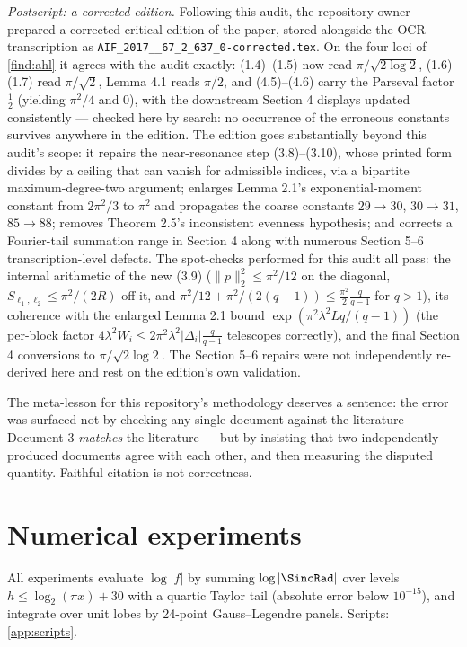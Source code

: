 \documentclass[11pt,oneside]{article}
\theoremstyle{definition}
\theoremstyle{remark}
\begin{document}
\emph{Postscript: a corrected edition.}  Following this audit, the
repository owner prepared a corrected critical edition of the paper,
stored alongside the OCR transcription as
\nolinkurl{AIF_2017__67_2_637_0-corrected.tex}.  On the four loci of
\cref{find:ahl} it agrees with the audit exactly: (1.4)--(1.5) now read
$\pi/\sqrt{2\log2}$, (1.6)--(1.7) read $\pi/\sqrt2$, Lemma 4.1 reads
$\pi/2$, and (4.5)--(4.6) carry the Parseval factor $\tfrac12$
(yielding $\pi^2/4$ and $0$), with the downstream Section 4 displays
updated consistently --- checked here by search: no occurrence of the
erroneous constants survives anywhere in the edition.  The edition goes
substantially beyond this audit's scope: it repairs the near-resonance
step (3.8)--(3.10), whose printed form divides by a ceiling that can
vanish for admissible indices, via a bipartite maximum-degree-two
argument; enlarges Lemma 2.1's exponential-moment constant from
$2\pi^2/3$ to $\pi^2$ and propagates the coarse constants
$29\to30$, $30\to31$, $85\to88$; removes Theorem 2.5's inconsistent
evenness hypothesis; and corrects a Fourier-tail summation range in
Section 4 along with numerous Section 5--6 transcription-level defects.
The spot-checks performed for this audit all pass: the internal
arithmetic of the new (3.9)
($\|p\|_2^2\le\pi^2/12$ on the diagonal, $S_{\ell_1,\ell_2}\le
\pi^2/(2R)$ off it, and
$\pi^2/12+\pi^2/(2(q-1))\le\tfrac{\pi^2}{2}\tfrac{q}{q-1}$ for
$q>1$), its coherence with the enlarged Lemma 2.1 bound
$\exp(\pi^2\lambda^2Lq/(q-1))$ (the per-block factor
$4\lambda^2W_i\le2\pi^2\lambda^2|\Delta_i|\tfrac q{q-1}$ telescopes
correctly), and the final Section 4 conversions to
$\pi/\sqrt{2\log2}$.  The Section 5--6 repairs were not independently
re-derived here and rest on the edition's own validation.

The meta-lesson for this repository's methodology deserves a sentence:
the error was surfaced not by checking any single document against the
literature --- Document 3 \emph{matches} the literature --- but by
insisting that two independently produced documents agree with each
other, and then measuring the disputed quantity.  Faithful citation is
not correctness.

\section{Numerical experiments}
\label{sec:numerics}

All experiments evaluate $\log|f|$ by summing
$\log|{\SincRad}|$ over levels $h\le\log_2(\pi x)+30$ with a quartic Taylor
tail (absolute error below $10^{-15}$), and integrate over unit lobes by
24-point Gauss--Legendre panels.  Scripts: \cref{app:scripts}.
\end{document}
